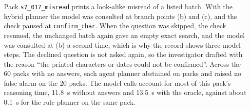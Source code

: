 Pack \texttt{s7\_017\_misread} prints a look-alike misread of a listed batch. With the hybrid planner the model was consulted at branch points (b) and (c), and the check paused at \texttt{confirm\_char}. When the question was skipped, the check resumed, the unchanged batch again gave an empty exact search, and the model was consulted at (b) a second time, which is why the record shows three model steps. The declined question is not asked again, so the investigator drafted \CANTV{} with the reason ``the printed characters or dates could not be confirmed''. Across the 60 packs with no answers, each agent planner abstained on  packs and raised no false alarm on the 20 \NLISTED{} packs. The model calls account for most of this pack's reasoning time, 11.8~s without answers and 13.5~s with the oracle, against about 0.1~s for the rule planner on the same pack.
